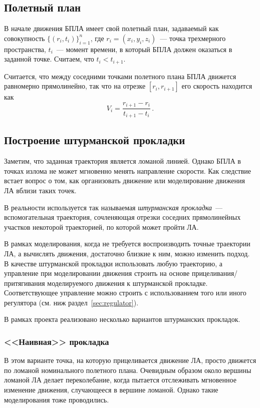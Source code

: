 \documentclass[a4paper,12pt]{article}
\numberwithin{figure}{subsubsection}
\begin{document}
\subsection{Полетный план}

В начале движения БПЛА имеет свой полетный план, задаваемый как совокупность $\{(r_i, t_i)\}_{i=1}^n$, где $r_i=(x_i,y_i,z_i)$~--- точка трехмерного пространства, $t_i$~--- момент времени, в который БПЛА должен оказаться в заданной точке. Считаем, что $t_i < t_{i+1}$.

Считается, что между соседними точками полетного плана БПЛА движется равномерно прямолинейно, так что на отрезке $[r_i,r_{i+1}]$ его скорость находится как
$$
  V_i = \frac{r_{i+1} - r_i}{t_{i+1} - t_i}\,.
$$

\subsection{Построение штурманской прокладки}

Заметим, что заданная траектория является ломаной линией. Однако БПЛА в точках излома не может мгновенно менять направление скорости. Как следствие встает вопрос о том, как организовать движение или моделирование движения ЛА вблизи таких точек.

В реальности используется так называемая \textit{штурманская прокладка}~--- вспомогательная траектория, сочленяющая отрезки соседних прямолинейных участков некоторой траекторией, по которой может пройти ЛА. 

В рамках моделирования, когда не требуется воспроизводить точные траектории ЛА, а вычислять движения, достаточно близкие к ним, можно изменить подход. В качестве штурманской прокладки использовать любую траекторию, а управление при моделировании движения строить на основе прицеливания/притягивания моделируемого движения к штурманской прокладке. Соответствующее управление можно строить с использованием того или иного регулятора (см. ниж раздел~\ref{sec:regulator}).

В рамках проекта реализовано несколько вариантов штурманских прокладок.

\subsubsection{<<Наивная>> прокладка}

В этом варианте точка, на которую прицеливается движение ЛА, просто движется по ломаной номинального полетного плана. Очевидным образом около вершины ломаной ЛА делает переколебание, когда пытается отслеживать мгновенное изменение движения, случающееся в вершине ломаной. Однако такие моделирования тоже проводились.
\end{document}
